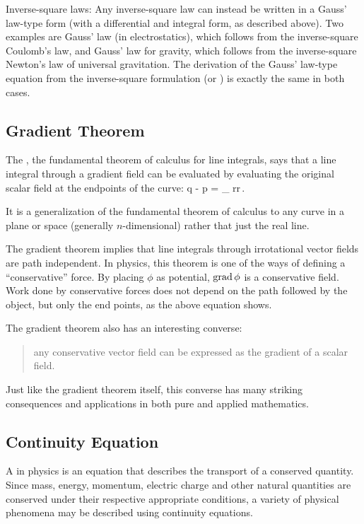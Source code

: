 Inverse-square laws: Any inverse-square law can instead be written in a Gauss' law-type form (with a differential and integral form, as described above). Two examples are Gauss' law (in electrostatics), which follows from the inverse-square Coulomb's law, and Gauss' law for gravity, which follows from the inverse-square Newton's law of universal gravitation. The derivation of the Gauss' law-type equation from the inverse-square formulation (or \vis) is exactly the same in both cases.


\subsection{Gradient Theorem}
The , \aka the fundamental theorem of calculus for line integrals, says that a line integral through a gradient field can be evaluated by evaluating the original scalar field at the endpoints of the curve:
\beq
\phi\vat q - \phi\vat p = \int_{\gamma{}} \grad\phi\vat r\iprod\dx r\,.
\eeq

It is a generalization of the fundamental theorem of calculus to any curve in a plane or space (generally $n$-dimensional) rather that just the real line.

The gradient theorem implies that line integrals through irrotational vector fields are path independent. In physics, this theorem is one of the ways of defining a ``conservative'' force. By placing $\phi$ as potential, $\operatorname{grad}\phi$ is a conservative field. Work done by conservative forces does not depend on the path followed by the object, but only the end points, as the above equation shows.

The gradient theorem also has an interesting converse:
\begin{quote}
any conservative vector field can be expressed as the gradient of a scalar field.
\end{quote}
Just like the gradient theorem itself, this converse has many striking consequences and applications in both pure and applied mathematics.


\subsection{Continuity Equation}
A  in physics is an equation that describes the transport of a conserved quantity. Since mass, energy, momentum, electric charge and other natural quantities are conserved under their respective appropriate conditions, a variety of physical phenomena may be described using continuity equations.

